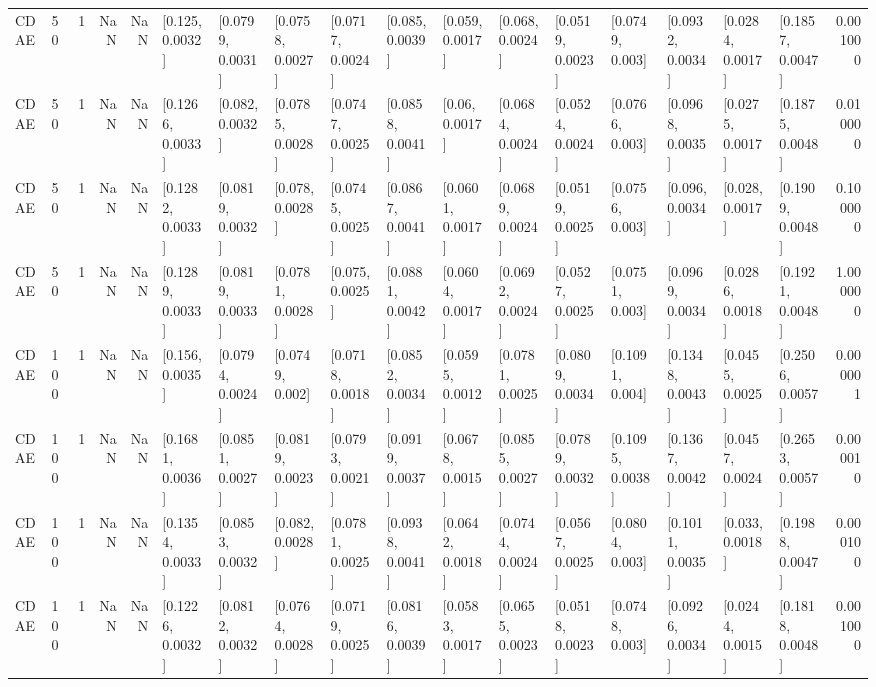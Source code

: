 \begin{tabular}{lllrrllllllllllllr}
    CDAE &   50 &     1 &   NaN &   NaN &   [0.125, 0.0032] &  [0.0799, 0.0031] &  [0.0758, 0.0027] &  [0.0717, 0.0024] &   [0.085, 0.0039] &   [0.059, 0.0017] &   [0.068, 0.0024] &  [0.0519, 0.0023] &   [0.0749, 0.003] &  [0.0932, 0.0034] &  [0.0284, 0.0017] &  [0.1857, 0.0047] &  0.001000 \\
    CDAE &   50 &     1 &   NaN &   NaN &  [0.1266, 0.0033] &   [0.082, 0.0032] &  [0.0785, 0.0028] &  [0.0747, 0.0025] &  [0.0858, 0.0041] &    [0.06, 0.0017] &  [0.0684, 0.0024] &  [0.0524, 0.0024] &   [0.0766, 0.003] &  [0.0968, 0.0035] &  [0.0275, 0.0017] &  [0.1875, 0.0048] &  0.010000 \\
    CDAE &   50 &     1 &   NaN &   NaN &  [0.1282, 0.0033] &  [0.0819, 0.0032] &   [0.078, 0.0028] &  [0.0745, 0.0025] &  [0.0867, 0.0041] &  [0.0601, 0.0017] &  [0.0689, 0.0024] &  [0.0519, 0.0025] &   [0.0756, 0.003] &   [0.096, 0.0034] &   [0.028, 0.0017] &  [0.1909, 0.0048] &  0.100000 \\
    CDAE &   50 &     1 &   NaN &   NaN &  [0.1289, 0.0033] &  [0.0819, 0.0033] &  [0.0781, 0.0028] &   [0.075, 0.0025] &  [0.0881, 0.0042] &  [0.0604, 0.0017] &  [0.0692, 0.0024] &  [0.0527, 0.0025] &   [0.0751, 0.003] &  [0.0969, 0.0034] &  [0.0286, 0.0018] &  [0.1921, 0.0048] &  1.000000 \\
    CDAE &  100 &     1 &   NaN &   NaN &   [0.156, 0.0035] &  [0.0794, 0.0024] &   [0.0749, 0.002] &  [0.0718, 0.0018] &  [0.0852, 0.0034] &  [0.0595, 0.0012] &  [0.0781, 0.0025] &  [0.0809, 0.0034] &   [0.1091, 0.004] &  [0.1348, 0.0043] &  [0.0455, 0.0025] &  [0.2506, 0.0057] &  0.000001 \\
    CDAE &  100 &     1 &   NaN &   NaN &  [0.1681, 0.0036] &  [0.0851, 0.0027] &  [0.0819, 0.0023] &  [0.0793, 0.0021] &  [0.0919, 0.0037] &  [0.0678, 0.0015] &  [0.0855, 0.0027] &  [0.0789, 0.0032] &  [0.1095, 0.0038] &  [0.1367, 0.0042] &  [0.0457, 0.0024] &  [0.2653, 0.0057] &  0.000010 \\
    CDAE &  100 &     1 &   NaN &   NaN &  [0.1354, 0.0033] &  [0.0853, 0.0032] &   [0.082, 0.0028] &  [0.0781, 0.0025] &  [0.0938, 0.0041] &  [0.0642, 0.0018] &  [0.0744, 0.0024] &  [0.0567, 0.0025] &   [0.0804, 0.003] &  [0.1011, 0.0035] &   [0.033, 0.0018] &  [0.1988, 0.0047] &  0.000100 \\
    CDAE &  100 &     1 &   NaN &   NaN &  [0.1226, 0.0032] &  [0.0812, 0.0032] &  [0.0764, 0.0028] &  [0.0719, 0.0025] &  [0.0816, 0.0039] &  [0.0583, 0.0017] &  [0.0655, 0.0023] &  [0.0518, 0.0023] &   [0.0748, 0.003] &  [0.0926, 0.0034] &  [0.0244, 0.0015] &  [0.1818, 0.0048] &  0.001000 \\

\end{tabular}
